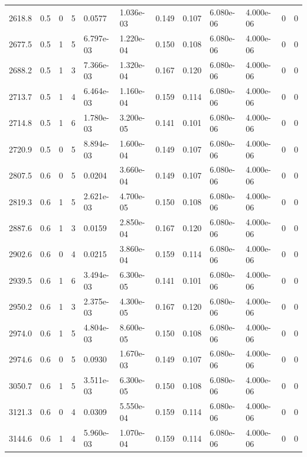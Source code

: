 \documentclass[preview]{standalone}
\begin{document}
{{{\begin{tabular}{L{1.2cm}C{1.2cm} C{0.3cm}C{0.5cm} C{1.4cm}C{1.4cm} C{1.4cm}C{1.4cm} C{1.6cm}C{1.6cm} C{1.6cm}C{1.6cm}}
  2618.8  &   0.5  & 0     &  5 &  0.0577  & 1.036e-03  &  0.149&   0.107& 6.080e-06 & 4.000e-06   &  0 & 0  \\ 
  2677.5  &   0.5  & 1     &  5 &  6.797e-03  & 1.220e-04  &  0.150&   0.108& 6.080e-06 & 4.000e-06   &  0 & 0  \\ 
  2688.2  &   0.5  & 1     &  3 &  7.366e-03  & 1.320e-04  &  0.167&   0.120& 6.080e-06 & 4.000e-06   &  0 & 0  \\ 
  2713.7  &   0.5  & 1     &  4 &  6.464e-03  & 1.160e-04  &  0.159&   0.114& 6.080e-06 & 4.000e-06   &  0 & 0  \\ 
  2714.8  &   0.5  & 1     &  6 &  1.780e-03  & 3.200e-05  &  0.141&   0.101& 6.080e-06 & 4.000e-06   &  0 & 0  \\ 
  2720.9  &   0.5  & 0     &  5 &  8.894e-03  & 1.600e-04  &  0.149&   0.107& 6.080e-06 & 4.000e-06   &  0 & 0  \\ 
  2807.5  &   0.6  & 0     &  5 &  0.0204  & 3.660e-04  &  0.149&   0.107& 6.080e-06 & 4.000e-06   &  0 & 0  \\ 
  2819.3  &   0.6  & 1     &  5 &  2.621e-03  & 4.700e-05  &  0.150&   0.108& 6.080e-06 & 4.000e-06   &  0 & 0  \\ 
  2887.6  &   0.6  & 1     &  3 &  0.0159  & 2.850e-04  &  0.167&   0.120& 6.080e-06 & 4.000e-06   &  0 & 0  \\ 
  2902.6  &   0.6  & 0     &  4 &  0.0215  & 3.860e-04  &  0.159&   0.114& 6.080e-06 & 4.000e-06   &  0 & 0  \\ 
  2939.5  &   0.6  & 1     &  6 &  3.494e-03  & 6.300e-05  &  0.141&   0.101& 6.080e-06 & 4.000e-06   &  0 & 0  \\ 
  2950.2  &   0.6  & 1     &  3 &  2.375e-03  & 4.300e-05  &  0.167&   0.120& 6.080e-06 & 4.000e-06   &  0 & 0  \\ 
  2974.0  &   0.6  & 1     &  5 &  4.804e-03  & 8.600e-05  &  0.150&   0.108& 6.080e-06 & 4.000e-06   &  0 & 0  \\ 
  2974.6  &   0.6  & 0     &  5 &  0.0930  & 1.670e-03  &  0.149&   0.107& 6.080e-06 & 4.000e-06   &  0 & 0  \\ 
  3050.7  &   0.6  & 1     &  5 &  3.511e-03  & 6.300e-05  &  0.150&   0.108& 6.080e-06 & 4.000e-06   &  0 & 0  \\ 
  3121.3  &   0.6  & 0     &  4 &  0.0309  & 5.550e-04  &  0.159&   0.114& 6.080e-06 & 4.000e-06   &  0 & 0  \\ 
  3144.6  &   0.6  & 1     &  4 &  5.960e-03  & 1.070e-04  &  0.159&   0.114& 6.080e-06 & 4.000e-06   &  0 & 0  \\ 

\end{tabular}}}}
\end{document}
